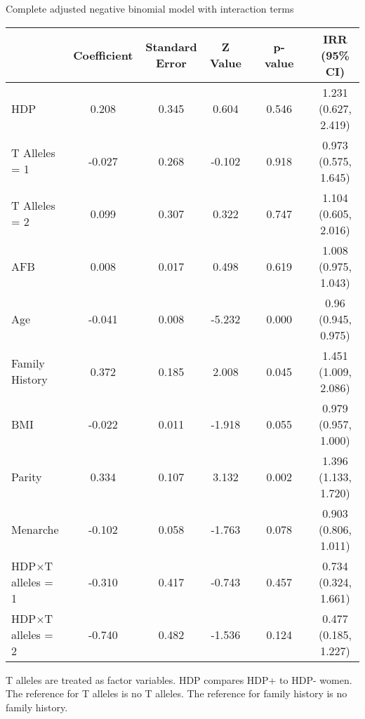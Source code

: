 \documentclass{standalone}
\begin{document}
\begin{threeparttable}
\caption{Complete adjusted negative binomial model with interaction terms} 
\begin{tabular}{@{}lccccccc@{}}
  \toprule
 & Coefficient & Standard Error & Z Value & \hspace{1em} & p-value & \hspace{1em} & IRR (95\% CI) \\ 
  \midrule
  HDP & 0.208 & 0.345 & 0.604 && 0.546 && 1.231 (0.627, 2.419) \\ 
  T Alleles = 1 & -0.027 & 0.268 & -0.102 && 0.918 && 0.973 (0.575, 1.645) \\ 
  T Alleles = 2 & 0.099 & 0.307 & 0.322 && 0.747 && 1.104 (0.605, 2.016) \\ 
  AFB & 0.008 & 0.017 & 0.498 && 0.619 && 1.008 (0.975, 1.043) \\ 
  Age & -0.041 & 0.008 & -5.232 && 0.000 && 0.96 (0.945, 0.975) \\ 
  Family History & 0.372 & 0.185 & 2.008 && 0.045 && 1.451 (1.009, 2.086) \\ 
  BMI & -0.022 & 0.011 & -1.918 && 0.055 && 0.979 (0.957, 1.000) \\ 
  Parity & 0.334 & 0.107 & 3.132 && 0.002 && 1.396 (1.133, 1.720) \\ 
  Menarche & -0.102 & 0.058 & -1.763 && 0.078 && 0.903 (0.806, 1.011) \\ 
  HDP$\times$T alleles = 1 & -0.310 & 0.417 & -0.743 && 0.457 && 0.734 (0.324, 1.661) \\ 
  HDP$\times$T alleles = 2 & -0.740 & 0.482 & -1.536 && 0.124 && 0.477 (0.185, 1.227) \\ 
   \bottomrule
\end{tabular}
\captionsetup{justification   = raggedright,
              singlelinecheck = false}
\caption*{T alleles are treated as factor variables. HDP compares HDP+ to HDP- women. The reference for T alleles is no T alleles. The reference for family history is no family history.}
\end{threeparttable}
\end{document}
